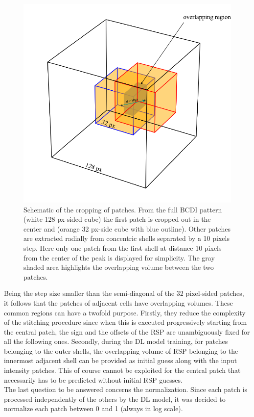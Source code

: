 \begin{figure}[H]
    \centering
    \includegraphics[width=\textwidth]{figures/Phasing/patching_cropping.pdf}
    \caption{Schematic of the cropping of patches. From the full BCDI pattern (white 128 px-sided cube) the first patch is 
    cropped out in the center and (orange 32 px-side cube with blue outline). Other patches are extracted radially from 
    concentric shells separated by a 10 pixels step. Here only one patch from the first shell at distance 10 pixels from the 
    center of the peak is displayed for simplicity. The gray shaded area highlights the overlapping volume between the 
    two patches. }
    
    \label{fig:patches_cropping}
\end{figure}

Being the step size smaller than the 
semi-diagonal of the 32 pixel-sided patches, it follows that the patches of adjacent cells have overlapping volumes. 
These common regions can have a twofold purpose. Firstly, they reduce the complexity of the stitching procedure since 
when this is executed progressively starting from the central patch, the sign and the offsets of the RSP are unambiguously 
fixed for all the following ones. Secondly, during the DL model training, for patches belonging to the outer shells, 
the overlapping volume of RSP belonging to the innermost adjacent shell can be provided as initial guess along with the input 
intensity patches. This of course cannot be exploited for the central patch that necessarily has to be predicted without 
initial RSP guesses. \\
The last question to be answered concerns the normalization. Since each patch is processed independently of the others 
by the DL model, it was decided to normalize each patch between 0 and 1 (always in log scale). 

